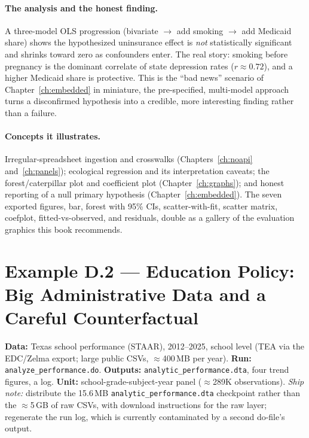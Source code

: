 \documentclass[
    a4paper,
    fontsize=10pt,
    twoside=true,
    numbers=noenddot,
]{kaobook}
\begin{document}
\paragraph{The analysis and the honest finding.} A three-model OLS progression (bivariate $\rightarrow$ add smoking $\rightarrow$ add Medicaid share) shows the hypothesized uninsurance effect is \emph{not} statistically significant and shrinks toward zero as confounders enter. The real story: smoking before pregnancy is the dominant correlate of state depression rates ($r \approx 0.72$), and a higher Medicaid share is protective. This is the \enquote{bad news} scenario of Chapter~\ref{ch:embedded} in miniature, the pre-specified, multi-model approach turns a disconfirmed hypothesis into a credible, more interesting finding rather than a failure.

\paragraph{Concepts it illustrates.} Irregular-spreadsheet ingestion and crosswalks (Chapters~\ref{ch:noapi} and~\ref{ch:panels}); ecological regression and its interpretation caveats; the forest/caterpillar plot and coefficient plot (Chapter~\ref{ch:graphs}); and honest reporting of a null primary hypothesis (Chapter~\ref{ch:embedded}). The seven exported figures, bar, forest with 95\% CIs, scatter-with-fit, scatter matrix, coefplot, fitted-vs-observed, and residuals, double as a gallery of the evaluation graphics this book recommends.

\section*{Example D.2 --- Education Policy: Big Administrative Data and a Careful Counterfactual}
\begin{kaobox}[frametitle=Get the files: \texttt{edc-3.0-texas/}]
\textbf{Data:} Texas school performance (STAAR), 2012--2025, school level (TEA via the EDC/Zelma export; large public CSVs, $\approx$400\,MB per year).
\textbf{Run:} \texttt{analyze\_performance.do}. \textbf{Outputs:} \texttt{analytic\_performance.dta}, four trend figures, a log.
\textbf{Unit:} school-grade-subject-year panel ($\approx$289K observations). \emph{Ship note:} distribute the 15.6\,MB \texttt{analytic\_performance.dta} checkpoint rather than the $\approx$5\,GB of raw CSVs, with download instructions for the raw layer; regenerate the run log, which is currently contaminated by a second do-file's output.
\end{kaobox}
\end{document}
